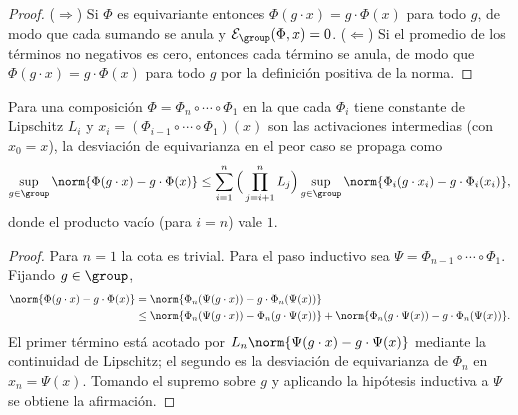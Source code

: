 \begin{proof}
($\Rightarrow$) Si $\Phi$ es equivariante entonces $\Phi(g \cdot x) = g \cdot
\Phi(x)$ para todo $g$, de modo que cada sumando se anula y
$\mathcal{E}_{\group}(\Phi,x) = 0$. ($\Leftarrow$) Si el promedio de los
t\'erminos no negativos es cero, entonces cada t\'ermino se anula, de modo que
$\Phi(g \cdot x) = g \cdot \Phi(x)$ para todo $g$ por la definici\'on positiva de
la norma.
\end{proof}

\begin{proposition}
\label{prop:groups:error-propagation}
Para una composici\'on $\Phi = \Phi_n \circ \cdots \circ \Phi_1$ en la que cada
$\Phi_i$ tiene constante de Lipschitz $L_i$ y $x_i = (\Phi_{i-1} \circ \cdots
\circ \Phi_1)(x)$ son las activaciones intermedias (con $x_0 = x$), la
desviaci\'on de equivarianza en el peor caso se propaga como
\begin{equation}
  \sup_{g \in \group} \norm{\Phi(g \cdot x) - g \cdot \Phi(x)}
  \leq \sum_{i=1}^{n} \Big(\prod_{j=i+1}^{n} L_j\Big)
    \sup_{g \in \group} \norm{\Phi_i(g \cdot x_i) - g \cdot \Phi_i(x_i)},
\end{equation}
donde el producto vac\'io (para $i = n$) vale $1$.
\end{proposition}

\begin{proof}
Para $n = 1$ la cota es trivial. Para el paso inductivo sea $\Psi =
\Phi_{n-1} \circ \cdots \circ \Phi_1$. Fijando $g \in \group$,
\begin{align}
  \norm{\Phi(g \cdot x) - g \cdot \Phi(x)}
  &= \norm{\Phi_n(\Psi(g \cdot x)) - g \cdot \Phi_n(\Psi(x))} \\
  &\leq \norm{\Phi_n(\Psi(g \cdot x)) - \Phi_n(g \cdot \Psi(x))}
      + \norm{\Phi_n(g \cdot \Psi(x)) - g \cdot \Phi_n(\Psi(x))}.
\end{align}
El primer t\'ermino est\'a acotado por $L_n \norm{\Psi(g \cdot x) - g \cdot
\Psi(x)}$ mediante la continuidad de Lipschitz; el segundo es la desviaci\'on de
equivarianza de $\Phi_n$ en $x_n = \Psi(x)$. Tomando el supremo sobre $g$ y
aplicando la hip\'otesis inductiva a $\Psi$ se obtiene la afirmaci\'on.
\end{proof}

